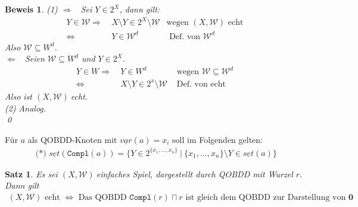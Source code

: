\documentclass[ngerman]{scrartcl}
\theoremstyle{custom}
\newtheorem{ms}[mdef]{Satz}
\newtheorem*{bw}{Beweis}
\newcommand{\0}{\mathbf{0}}
\newcommand{\1}{\mathbf{L}}
\newcommand{\var}{\underline{var}}
\newcommand{\set}{\underline{set}}
\newcommand{\sg}{$(X,\mathcal{W})~$}
\newcommand{\W}{\mathcal{W}}
\begin{document}
\begin{bw}
(1) \glqq $\Rightarrow$\grqq~ Sei $Y \in 2^X$, dann gilt:
\begin{align*}
Y \in \W \Rightarrow&~ X \setminus Y \in 2^X \setminus \W & \text{
  wegen } (X,\W)
\text{ echt}\\
\Leftrightarrow&~ Y \in \W^d & \text{ Def. von } \W^d
\end{align*}
Also $\W \subseteq W^d$.\\
\glqq $\Leftarrow$\grqq~ Seien $\W \subseteq W^d$ und $Y \in 2^X$.
\begin{align*}
Y \in W \Rightarrow&~ Y \in W^d & \text{ wegen } \W \subseteq \W^d\\
\Leftrightarrow&~ X \setminus Y \in 2^x \setminus \W & \text{ Def. von
 echt}
\end{align*}
Also ist \sg echt.\\

(2) Analog.\\

\qed
\end{bw}
F\"ur $a$ als QOBDD-Knoten mit $\var(a)=x_i$ soll im Folgenden gelten:
\begin{align*}
\text{ (*) } \set(\texttt{Compl}(a)) = \{ Y \in 2^{\{x_1,\dots,x_n\}}
~|~ \{x_1, \dots, x_n\} \setminus Y \in \set(a)\}
\end{align*}

\begin{ms}
Es sei \sg einfaches Spiel, dargestellt durch QOBDD mit Wurzel
$r$. Dann gilt
\begin{align*}
(X,\W) \text{ echt } \Leftrightarrow \text{ Das QOBDD }
\texttt{Compl}(r) \sqcap r \text{ ist gleich dem QOBDD zur Darstellung
  von } \0
\end{align*}
\end{ms}
\end{document}
